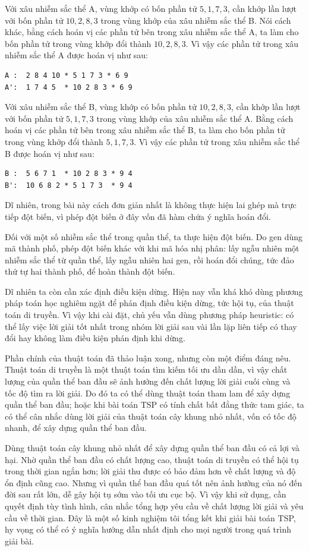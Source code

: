 \documentclass[11pt]{article}
\begin{document}
Với xâu nhiễm sắc thể A, vùng khớp có bốn phần tử \(5,1,7,3\), cần khớp lần
lượt với bốn phần tử \(10,2,8,3\) trong vùng khớp của xâu nhiễm sắc thể B.
Nói cách khác, bằng cách hoán vị các phần tử bên trong xâu nhiễm sắc thể A,
ta làm cho bốn phần tử trong vùng khớp đổi thành \(10,2,8,3\). Vì vậy các
phần tử trong xâu nhiễm sắc thể A được hoán vị như sau:
\begin{verbatim}
A :  2 8 4 10 * 5 1 7 3 * 6 9
A':  1 7 4 5  * 10 2 8 3 * 6 9
\end{verbatim}

Với xâu nhiễm sắc thể B, vùng khớp có bốn phần tử \(10,2,8,3\), cần khớp lần
lượt với bốn phần tử \(5,1,7,3\) trong vùng khớp của xâu nhiễm sắc thể A.
Bằng cách hoán vị các phần tử bên trong xâu nhiễm sắc thể B, ta làm cho bốn
phần tử trong vùng khớp đổi thành \(5,1,7,3\). Vì vậy các phần tử trong xâu
nhiễm sắc thể B được hoán vị như sau:
\begin{verbatim}
B :  5 6 7 1  * 10 2 8 3 * 9 4
B':  10 6 8 2 * 5 1 7 3  * 9 4
\end{verbatim}

Dĩ nhiên, trong bài này cách đơn giản nhất là không thực hiện lai ghép mà
trực tiếp đột biến, vì phép đột biến ở đây vốn đã hàm chứa ý nghĩa hoán đổi.

Đối với một số nhiễm sắc thể trong quần thể, ta thực hiện đột biến. Do gen
dùng mã thành phố, phép đột biến khác với khi mã hóa nhị phân: lấy ngẫu nhiên
một nhiễm sắc thể từ quần thể, lấy ngẫu nhiên hai gen, rồi hoán đổi chúng,
tức đảo thứ tự hai thành phố, để hoàn thành đột biến.

Dĩ nhiên ta còn cần xác định điều kiện dừng. Hiện nay vẫn khá khó dùng
phương pháp toán học nghiêm ngặt để phán định điều kiện dừng, tức hội tụ, của
thuật toán di truyền. Vì vậy khi cài đặt, chủ yếu vẫn dùng phương pháp heuristic:
có thể lấy việc lời giải tốt nhất trong nhóm lời giải sau vài lần lặp liên
tiếp có thay đổi hay không làm điều kiện phán định khi dừng.

Phần chính của thuật toán đã thảo luận xong, nhưng còn một điểm đáng nêu.
Thuật toán di truyền là một thuật toán tìm kiếm tối ưu dần dần, vì vậy chất
lượng của quần thể ban đầu sẽ ảnh hưởng đến chất lượng lời giải cuối cùng và
tốc độ tìm ra lời giải. Do đó ta có thể dùng thuật toán tham lam để xây dựng
quần thể ban đầu; hoặc khi bài toán TSP có tính chất bất đẳng thức tam giác,
ta có thể cân nhắc dùng lời giải của thuật toán cây khung nhỏ nhất, vốn có
tốc độ nhanh, để xây dựng quần thể ban đầu.

Dùng thuật toán cây khung nhỏ nhất để xây dựng quần thể ban đầu có cả lợi và
hại. Nhờ quần thể ban đầu có chất lượng cao, thuật toán di truyền có thể hội
tụ trong thời gian ngắn hơn; lời giải thu được có bảo đảm hơn về chất lượng
và độ ổn định cũng cao. Nhưng vì quần thể ban đầu quá tốt nên ảnh hưởng của
nó đến đời sau rất lớn, dễ gây hội tụ sớm vào tối ưu cục bộ. Vì vậy khi sử
dụng, cần quyết định tùy tình hình, cân nhắc tổng hợp yêu cầu về chất lượng
lời giải và yêu cầu về thời gian. Đây là một số kinh nghiệm tôi tổng kết khi
giải bài toán TSP, hy vọng có thể có ý nghĩa hướng dẫn nhất định cho mọi
người trong quá trình giải bài.
\end{document}
